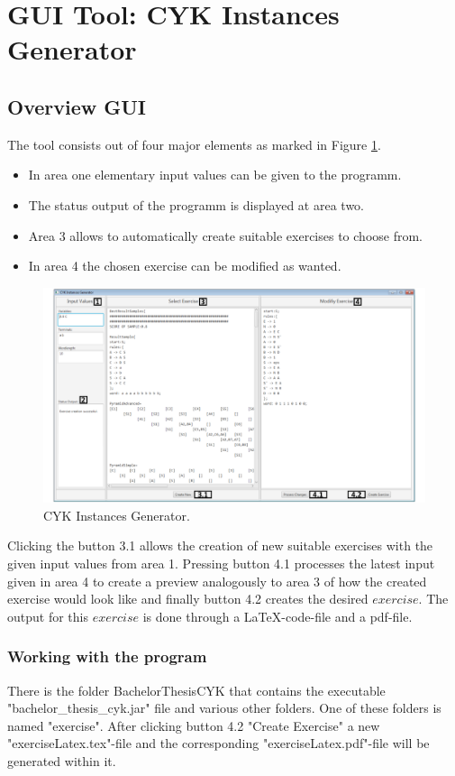 
\section{GUI Tool: CYK Instances Generator }

\subsection{Overview GUI}
The tool consists out of four major elements as marked in Figure \ref{CYKInstancesGenerator}.
\begin{itemize} [noitemsep]
	\item In area one elementary input values can be given to the programm.
	\item The status output of the programm is displayed at area two.
	\item Area 3 allows to automatically create suitable exercises to choose from.
	\item In area 4 the chosen exercise can be modified as wanted.
\end{itemize}
\begin{figure}[h]
	\centering
	\includegraphics[width=\textwidth]{abb/CYKInstancesGenerator.pdf}
	\caption{CYK Instances Generator.}
	\label{CYKInstancesGenerator}
\end{figure}
Clicking the button 3.1 allows the creation of new suitable exercises with the given input values from area 1. Pressing button 4.1 processes the latest input given in area 4 to create a preview analogously to area 3 of how the created exercise would look like and finally button 4.2 creates the desired $exercise$. The output for this $exercise$ is done through a \LaTeX-code-file and a pdf-file.
\subsubsection{Working with the program}
There is the folder BachelorThesisCYK that contains the executable "bachelor\_thesis\_\allowbreak cyk.jar" file and various other folders. One of these folders is named "exercise". After clicking button 4.2 "Create Exercise" a new "exerciseLatex.tex"-file and the corresponding "exerciseLatex.pdf"-file will be generated within it. 
\pagebreak

